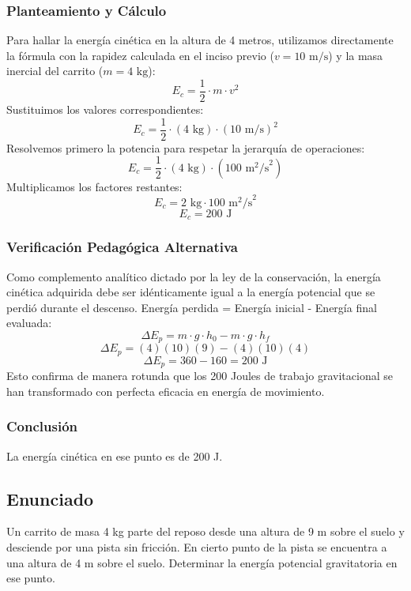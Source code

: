 \documentclass[12pt,a4paper]{article}
\begin{document}
\subsubsection*{Planteamiento y Cálculo}
Para hallar la energía cinética en la altura de 4 metros, utilizamos directamente la fórmula con la rapidez calculada en el inciso previo ($v = 10 \text{ m/s}$) y la masa inercial del carrito ($m = 4 \text{ kg}$):
$$E_c = \frac{1}{2} \cdot m \cdot v^2$$
Sustituimos los valores correspondientes:
$$E_c = \frac{1}{2} \cdot (4 \text{ kg}) \cdot (10 \text{ m/s})^2$$
Resolvemos primero la potencia para respetar la jerarquía de operaciones:
$$E_c = \frac{1}{2} \cdot (4 \text{ kg}) \cdot (100 \text{ m}^2\text{/s}^2)$$
Multiplicamos los factores restantes:
$$E_c = 2 \text{ kg} \cdot 100 \text{ m}^2\text{/s}^2$$
$$E_c = 200 \text{ J}$$

\subsubsection*{Verificación Pedagógica Alternativa}
Como complemento analítico dictado por la ley de la conservación, la energía cinética adquirida debe ser idénticamente igual a la energía potencial que se perdió durante el descenso.
Energía perdida = Energía inicial - Energía final evaluada:
$$\Delta E_p = m \cdot g \cdot h_0 - m \cdot g \cdot h_f$$
$$\Delta E_p = (4)(10)(9) - (4)(10)(4)$$
$$\Delta E_p = 360 - 160 = 200 \text{ J}$$
Esto confirma de manera rotunda que los 200 Joules de trabajo gravitacional se han transformado con perfecta eficacia en energía de movimiento.

\subsubsection*{Conclusión}
La energía cinética en ese punto es de 200 J.

\newpage
\subsection*{Enunciado}
Un carrito de masa 4 kg parte del reposo desde una altura de 9 m sobre el suelo y desciende por una pista sin fricción. En cierto punto de la pista se encuentra a una altura de 4 m sobre el suelo. Determinar la energía potencial gravitatoria en ese punto.
\end{document}
